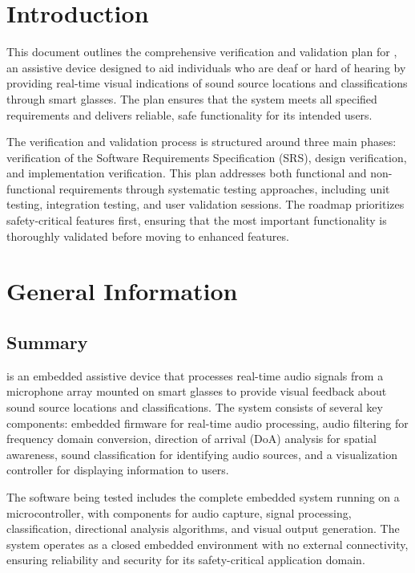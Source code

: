 \documentclass[12pt, titlepage]{article}
\begin{document}
\section{Introduction}

This document outlines the comprehensive verification and validation plan for
\progname{}, an assistive device designed to aid individuals who are deaf or
hard of hearing by providing real-time visual indications of sound source
locations and classifications through smart glasses. The plan ensures that the
system meets all specified requirements and delivers reliable, safe
functionality for its intended users.

The verification and validation process is structured around three main phases:
verification of the Software Requirements Specification (SRS), design
verification, and implementation verification. This plan addresses both
functional and non-functional requirements through systematic testing
approaches, including unit testing, integration testing, and user validation
sessions. The roadmap prioritizes safety-critical features first, ensuring that
the most important functionality is thoroughly validated before moving to
enhanced features.

\section{General Information}

\subsection{Summary}

\progname{} is an embedded assistive device that processes real-time audio
signals from a microphone array mounted on smart glasses to provide visual
feedback about sound source locations and classifications. The system consists
of several key components: embedded firmware for real-time audio processing,
audio filtering for frequency domain conversion, direction of arrival (DoA)
analysis for spatial awareness, sound classification for identifying audio
sources, and a visualization controller for displaying information to users.

The software being tested includes the complete embedded system running on a
microcontroller, with components for audio capture, signal processing,
classification, directional analysis algorithms, and visual output generation.
The system operates as a closed embedded environment with no external
connectivity, ensuring reliability and security for its safety-critical
application domain.
\end{document}
